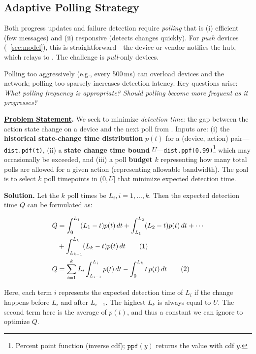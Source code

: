 {\subsection{Adaptive Polling Strategy}
\label{sec:adaptive-polling-strategy}

Both progress updates and failure detection require \emph{polling} that is (i) efficient (few messages) and (ii) responsive (detects changes quickly).
For \emph{push} devices (\Section~\ref{sec:model}), this is straightforward---the device or vendor notifies the hub, which relays to \sysname{}. 
The challenge is \emph{pull}-only devices.

Polling too aggressively (e.g., every 500\,ms) can overload devices and the network; polling too sparsely increases detection latency. 
Key questions arise: {\it What polling frequency is appropriate? Should polling become more frequent as it progresses?}

\noindent \textbf{\underline{Problem Statement}.}
We seek to minimize \emph{detection time}: the gap between the action state change on a device and the next poll from \sysname{}.
Inputs are: (i) the {\bf historical state-change time distribution} \(p(t)\) for a (device, action) pair---\texttt{dist.pdf(t)}, (ii) a {\bf state change time bound} $U$---\texttt{dist.ppf(0.99)}\footnote{Percent point function (inverse cdf); \(\texttt{ppf}(y)\) returns the value with cdf \(y\).} which may occasionally be exceeded, and (iii) a poll \textbf{budget} \(k\) representing how many total polls are allowed for a given action (representing allowable bandwidth).
The goal is to select \(k\) poll timepoints in \((0,U]\) that minimize expected detection time.


\noindent \textbf{Solution.}
Let the $k$ poll times be $L_i, i=1,...,k$. Then the expected detection time $Q$ can be formulated as:

\vspace{-0.4cm}
\begin{align}
Q &= \int_{0}^{L_1} (L_1-t)p(t)\,dt 
   + \int_{L_1}^{L_2} (L_2-t)p(t)\,dt + \cdots \notag \\ 
  &+ \int_{L_{k-1}}^{L_k} (L_k-t)p(t)\,dt \tag{1} \\
Q &= \sum_{i=1}^{k} L_i \int_{L_{i-1}}^{L_i} p(t)\, dt
   - \int_{0}^{L_k} t\,p(t)\, dt \tag{2} \label{eq:Q}
\end{align}

Here, each term $i$ represents the expected detection time of $L_i$ if the change happens before $L_i$ and after $L_{i-1}$. The highest ${L_k}$ is always equal to $U$.
The second term here is the average of $p(t)$, and thus a constant we can ignore to optimize $Q$.

}
